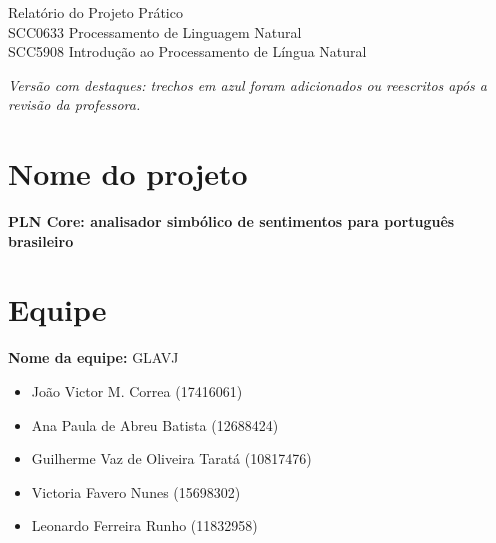 \documentclass[11pt,a4paper]{article}
\newcommand{\new}[1]{\textcolor{newblue}{#1}}
\begin{document}
\begin{center}
{\Large Relatório do Projeto Prático}\\[0.4em]
{\large SCC0633 Processamento de Linguagem Natural}\\[0.2em]
{\large SCC5908 Introdução ao Processamento de Língua Natural}\\[0.2em]
\end{center}

\noindent\textit{\small Versão com destaques: trechos em \new{azul} foram adicionados ou reescritos após a revisão da professora.}

\section{Nome do projeto}

\textbf{PLN Core: analisador simbólico de sentimentos para português brasileiro}

\section{Equipe}

\textbf{Nome da equipe:} GLAVJ

\begin{itemize}
  \item João Victor M. Correa (17416061)
  \item Ana Paula de Abreu Batista (12688424)
  \item Guilherme Vaz de Oliveira Taratá (10817476)
  \item Victoria Favero Nunes (15698302)
  \item Leonardo Ferreira Runho (11832958)
\end{itemize}
\end{document}
